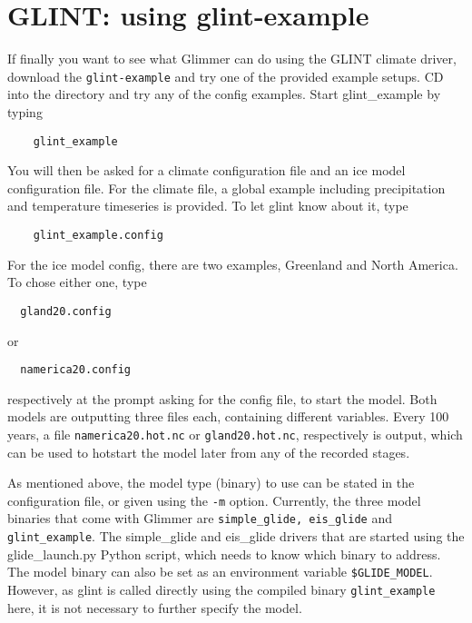 
\section{GLINT: using glint-example}
If finally you want to see what Glimmer can do using the GLINT climate driver,
download the \texttt{glint-example} and try one of the provided example setups.
CD into the directory and try any of the config examples. Start glint\_example
by typing
\begin{verbatim}
    glint_example
\end{verbatim}
You will then be asked for a climate configuration file and an ice model 
configuration file.
For the climate file, a global example including precipitation and temperature timeseries
is provided. To let glint know about it, type
\begin{verbatim}
    glint_example.config
\end{verbatim}
For the ice model config, there are two examples, Greenland and North America. To chose either one, type
\begin{verbatim}
  gland20.config
\end{verbatim}
or
\begin{verbatim}
  namerica20.config
\end{verbatim}
respectively at the prompt asking for the config file, to start the model.
Both models are outputting three files each, containing different variables.
Every 100 years, a file \texttt{namerica20.hot.nc} or \texttt{gland20.hot.nc}, respectively is output, 
which can be used to hotstart the model later from any of the recorded stages.

As mentioned above, the model type (binary) to use can be stated in the configuration file,
or given using the \texttt{-m} option. Currently, the three model binaries that
come with Glimmer are \texttt{simple\_glide, eis\_glide} and
\texttt{glint\_example}. The simple\_glide and eis\_glide drivers that are started using the glide\_launch.py Python script,
which needs to know which binary to address. The model binary can also be set as an environment variable \texttt{\$GLIDE\_MODEL}. 
However, as glint is called directly using the compiled binary \texttt{glint\_example} here, it is not necessary to further 
specify the model.
